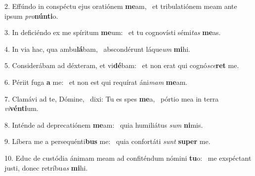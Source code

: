 2. Effúndo in conspéctu ejus oratiónem \textbf{me}am, \ast\  et tribulatiónem meam ante ipsum \textit{pro}\textbf{nún}\textbf{ti}o.\

3. In deficiéndo ex me spíritum \textbf{me}um: \ast\  et tu cognovísti sémi\textit{tas} \textbf{me}as.\

4. In via hac, qua ambu\textbf{lá}bam, \ast\  abscondérunt láque\textit{um} \textbf{mi}hi.\

5. Considerábam ad déxteram, et vi\textbf{dé}bam: \ast\  et non erat qui cognó\textit{sce}\textbf{ret} me.\

6. Périit fuga \textbf{a} me: \ast\  et non est qui requírat áni\textit{mam} \textbf{me}am.\

7. Clamávi ad te, Dómine, \dag\  dixi: Tu es spes \textbf{me}a, \ast\  pórtio mea in terra \textit{vi}\textbf{vén}\textbf{ti}um.\

8. Inténde ad deprecatiónem \textbf{me}am: \ast\  quia humiliátus \textit{sum} \textbf{ni}mis.\

9. Líbera me a persequénti\textbf{bus} me: \ast\  quia confortáti \textit{sunt} \textbf{su}\textbf{per} me.\

10. Educ de custódia ánimam meam ad confiténdum nómini \textbf{tu}o: \ast\  me exspéctant justi, donec retríbu\textit{as} \textbf{mi}hi.\

